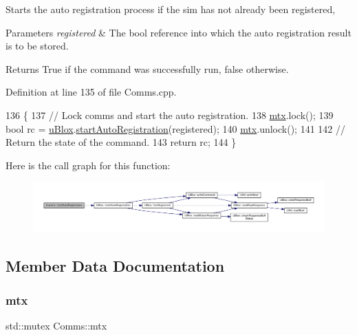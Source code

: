 Starts the auto registration process if the sim has not already been registered,


\begin{DoxyParams}{Parameters}
{\em registered} & The bool reference into which the auto registration result is to be stored. \\
\hline
\end{DoxyParams}
\begin{DoxyReturn}{Returns}
True if the command was successfully run, false otherwise. 
\end{DoxyReturn}


Definition at line 135 of file Comms.\+cpp.


\begin{DoxyCode}
136 \{
137     \textcolor{comment}{// Lock comms and start the auto registration.}
138     \hyperlink{class_comms_a21df861b1202573e4cd0cb5666d638fe}{mtx}.lock();
139     \textcolor{keywordtype}{bool} rc = \hyperlink{class_comms_ac64dea134b116147e5441172346dbd6c}{uBlox}.\hyperlink{class_u_blox_a2e816e864ebf43743b3f6187e20c2b1f}{startAutoRegistration}(registered);
140     \hyperlink{class_comms_a21df861b1202573e4cd0cb5666d638fe}{mtx}.unlock();
141 
142     \textcolor{comment}{// Return the state of the command.}
143     \textcolor{keywordflow}{return} rc;
144 \}
\end{DoxyCode}
Here is the call graph for this function\+:
\nopagebreak
\begin{figure}[H]
\begin{center}
\leavevmode
\includegraphics[width=350pt]{d8/dcc/class_comms_a9563254514d2f64c0427be2aeaba26d8_cgraph}
\end{center}
\end{figure}


\subsection{Member Data Documentation}
\mbox{\label{class_comms_a21df861b1202573e4cd0cb5666d638fe}} 
\subsubsection{\texorpdfstring{mtx}{mtx}}
{\footnotesize\ttfamily std\+::mutex Comms\+::mtx\hspace{0.3cm}{\ttfamily [private]}}



